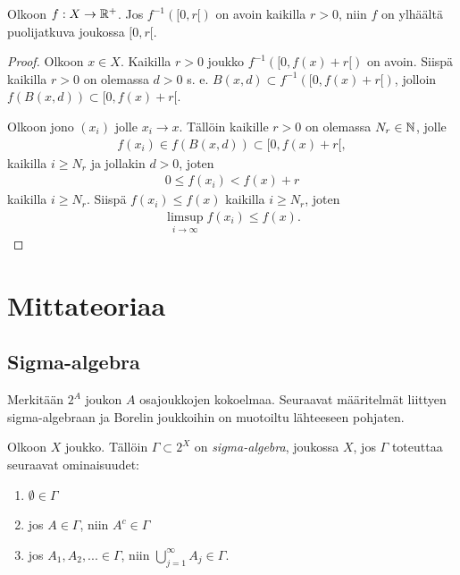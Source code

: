 \documentclass[12pt,oneside,a4paper]{amsbook} %
\begin{document}
\begin{lemma}\label{le:openPreimageImpliesUSC}
    Olkoon $f:X \to {\mathbb{R}^{+}}$. Jos $f^{-1}([0, r[)$ on avoin kaikilla $r > 0$, niin $f$ on ylhäältä puolijatkuva joukossa $[0, r[$.
\end{lemma}
\begin{proof}
    Olkoon $x \in X$. Kaikilla $r > 0$ joukko $f^{-1}([0, f(x) + r[)$ on avoin. Siispä kaikilla $r > 0$ on olemassa $d > 0$ s. e. $B(x, d) \subset f^{-1}([0, f(x) + r[)$, jolloin $f(B(x,d)) \subset [0, f(x) + r[$.
    
    Olkoon jono $(x_i)$ jolle $x_i \to x$. Tällöin kaikille $r > 0$ on olemassa $N_r \in \mathbb{N}$, jolle
    \begin{align*}
        f(x_i) \in f(B(x, d)) \subset [0, f(x) + r[,
    \end{align*}
    kaikilla $i \ge N_r$ ja jollakin $d > 0$, joten
    \begin{align*}
        0 \le f(x_i) < f(x) + r
    \end{align*}
    kaikilla $i \ge N_r$. Siispä $f(x_i) \le f(x)$ kaikilla $i \ge N_r$, joten
    \begin{align*}
        \limsup_{i\to \infty}f(x_i) \le f(x).
    \end{align*}
\end{proof}


\section{Mittateoriaa}
\subsection{Sigma-algebra}
Merkitään $2^A$ joukon $A$ osajoukkojen kokoelmaa. Seuraavat määritelmät liittyen sigma-algebraan ja Borelin joukkoihin on muotoiltu lähteeseen \cite[s. 86-87]{lehrbäck} pohjaten.

\begin{definition}
    Olkoon $X$ joukko. Tällöin $\Gamma \subset 2^X$ on \textit{sigma-algebra}, joukossa $X$, jos $\Gamma$ toteuttaa seuraavat ominaisuudet:
    \begin{enumerate}
        \item $\emptyset \in \Gamma$ 
        \item jos $A \in \Gamma$, niin $A^c \in \Gamma$
        \item jos $A_1, A_2, ... \in \Gamma$, niin $\bigcup_{j=1}^\infty A_j \in \Gamma$.
    \end{enumerate}
\end{definition}
\end{document}
